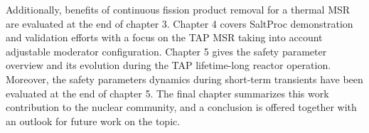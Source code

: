 Additionally, benefits of continuous fission product removal for a thermal 
\gls{MSR} are evaluated at the end of chapter 3. Chapter 4 covers SaltProc 
demonstration and validation efforts with a focus on the \gls{TAP} \gls{MSR} 
taking into account adjustable moderator configuration. Chapter 5 gives the 
safety parameter overview and its evolution during the \gls{TAP} 
lifetime-long reactor operation. Moreover, the safety parameters dynamics 
during short-term transients have been evaluated at the end of chapter 5. The 
final chapter summarizes this work contribution to the nuclear community, and 
a conclusion is offered together with an outlook for future work on the topic.